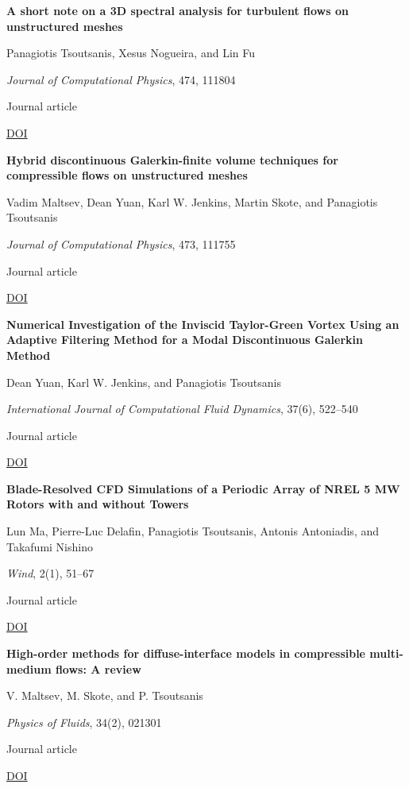 \documentclass[11pt,a4paper]{article}
\newlength{\cventrysep}
\newenvironment{cventry}{%
  \par\noindent\begin{minipage}{\linewidth}
  \RaggedRight\fontsize{9.8}{12.5}\selectfont
}{\end{minipage}\par\addvspace{\cventrysep}}
\newcommand{\cvtitle}[1]{{\bfseries #1\par}\vspace{1pt}}
\newcommand{\cvdetail}[1]{{#1\par}\vspace{1pt}}
\newcommand{\cvmeta}[1]{{\fontsize{9}{11.5}\selectfont\color{Muted}#1\par}\vspace{1pt}}
\newcommand{\cvlinks}[1]{{\fontsize{9}{11.5}\selectfont #1\par}}
\newcommand{\cvyear}[1]{{\color{Teal}\bfseries\fontsize{11}{13}\selectfont #1\par}\vspace{6pt}}
\begin{document}
\begin{cventry}
\cvtitle{A short note on a 3D spectral analysis for turbulent flows on unstructured meshes}
\cvdetail{Panagiotis Tsoutsanis, Xesus Nogueira, and Lin Fu}
\cvmeta{\textit{Journal of Computational Physics}, 474, 111804\par Journal article}
\cvlinks{\href{https://doi.org/10.1016/j.jcp.2022.111804}{DOI}}
\end{cventry}

\begin{cventry}
\cvtitle{Hybrid discontinuous Galerkin-finite volume techniques for compressible flows on unstructured meshes}
\cvdetail{Vadim Maltsev, Dean Yuan, Karl W. Jenkins, Martin Skote, and Panagiotis Tsoutsanis}
\cvmeta{\textit{Journal of Computational Physics}, 473, 111755\par Journal article}
\cvlinks{\href{https://doi.org/10.1016/j.jcp.2022.111755}{DOI}}
\end{cventry}

\begin{cventry}
\cvtitle{Numerical Investigation of the Inviscid Taylor-Green Vortex Using an Adaptive Filtering Method for a Modal Discontinuous Galerkin Method}
\cvdetail{Dean Yuan, Karl W. Jenkins, and Panagiotis Tsoutsanis}
\cvmeta{\textit{International Journal of Computational Fluid Dynamics}, 37(6), 522--540\par Journal article}
\cvlinks{\href{https://doi.org/10.1080/10618562.2024.2329775}{DOI}}
\end{cventry}

\begin{cventry}
\cvyear{2022}
\cvtitle{Blade-Resolved CFD Simulations of a Periodic Array of NREL 5 MW Rotors with and without Towers}
\cvdetail{Lun Ma, Pierre-Luc Delafin, Panagiotis Tsoutsanis, Antonis Antoniadis, and Takafumi Nishino}
\cvmeta{\textit{Wind}, 2(1), 51--67\par Journal article}
\cvlinks{\href{https://doi.org/10.3390/wind2010004}{DOI}}
\end{cventry}

\begin{cventry}
\cvtitle{High-order methods for diffuse-interface models in compressible multi-medium flows: A review}
\cvdetail{V. Maltsev, M. Skote, and P. Tsoutsanis}
\cvmeta{\textit{Physics of Fluids}, 34(2), 021301\par Journal article}
\cvlinks{\href{https://doi.org/10.1063/5.0077314}{DOI}}
\end{cventry}
\end{document}

